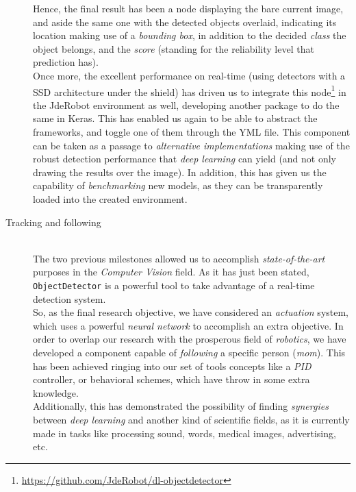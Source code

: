 \begin{description}
			Hence, the final result  has been a node displaying the bare current image, and aside the same one with the detected objects overlaid, indicating its location making use of a \emph{bounding box}, in addition to the decided \emph{class} the object belongs, and the \emph{score} (standing for the reliability level that prediction has).\\
			
			Once more, the excellent performance on real-time (using detectors with a SSD architecture under the shield) has driven us to integrate this node\footnote{\url{https://github.com/JdeRobot/dl-objectdetector}} in the JdeRobot environment as well, developing another package to do the same in Keras. This has enabled us again to be able to abstract the frameworks, and toggle one of them through the YML file. This component can be taken as a passage to \emph{alternative implementations} making use of the robust detection performance that \emph{deep learning} can yield (and not only drawing the results over the image). In addition, this has given us the capability of \emph{benchmarking} new models, as they can be transparently loaded into the created environment.
		
		\item[Tracking and following] \hfill
			\vspace{0.2in} \\
			The two previous milestones allowed us to accomplish \emph{state-of-the-art} purposes in the \emph{Computer Vision} field. As it has just been stated, \texttt{ObjectDetector} is a powerful tool to take advantage of a real-time detection system.\\
			
			So, as the final research objective, we have considered an \emph{actuation} system, which uses a powerful \emph{neural network} to accomplish an extra objective. In order to overlap our research with the prosperous field of \emph{robotics}, we have developed a component capable of \emph{following} a specific person (\emph{mom}). This has been achieved ringing into our set of tools concepts like a \emph{PID} controller, or behavioral schemes, which have throw in some extra knowledge.\\
			
			Additionally, this has demonstrated the possibility of finding \emph{synergies} between \emph{deep learning} and another kind of scientific fields, as it is currently made in tasks like processing sound, words, medical images, advertising, etc.
		
	\end{description}
	
